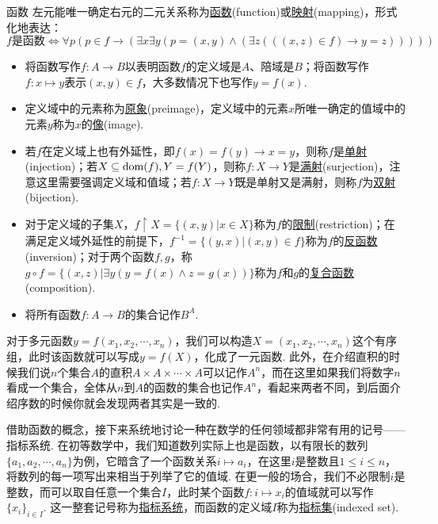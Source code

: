 \begin{definition}{函数}
    左元能唯一确定右元的二元关系称为\underline{函数}(function)或\underline{映射}(mapping)，形式化地表达：
    \[f \mbox{是函数} \Longleftrightarrow \forall p (p \in f \rightarrow (\exists x \exists y(p = (x,y) \wedge (\exists z(((x,z ) \in f) \rightarrow y=z)))))\]
    \begin{itemize}
        \item  将函数写作\(f:A \to B\)以表明函数\(f\)的定义域是\(A\)、陪域是\(B\)；将函数写作\(f:x \mapsto y\)表示\((x,y) \in f\)，大多数情况下也写作\(y=f(x)\).
        \item  定义域中的元素称为\underline{原象}(preimage)，定义域中的元素\(x\)所唯一确定的值域中的元素\(y\)称为\(x\)的\underline{像}(image).
        \item  若\(f\)在定义域上也有外延性，即\(f(x)=f(y) \rightarrow x=y\)，则称\(f\)是\underline{单射}(injection)；若\(X\subseteq{\rm dom}(f), Y=f(Y)\)，则称\(f:X\to Y\)是\underline{满射}(surjection)，注意这里需要强调定义域和值域；若\(f:X \to Y\)既是单射又是满射，则称\(f\)为\underline{双射}(bijection).
        \item  对于定义域的子集\(X\)，\(f\upharpoonright X=\{(x,y)|x \in X\}\)称为\(f\)的\underline{限制}(restriction)；在满足定义域外延性的前提下，\(f^{-1}=\{(y,x)|(x,y) \in f\}\)称为\(f\)的\underline{反函数}(inversion)；对于两个函数\(f,g\)，称\(g \circ f = \{(x,z)| \exists y(y=f(x) \wedge z=g(x))\}\)称为\(f\)和\(g\)的\underline{复合函数}(composition).
        \item  将所有函数\(f:A \to B\)的集合记作\(B^A\).
    \end{itemize}
\end{definition}

对于多元函数\(y = f(x_1,x_2,\cdots,x_n)\)，我们可以构造\(X = (x_1,x_2,\cdots,x_n)\)这个有序组，此时该函数就可以写成\(y = f(X)\)，化成了一元函数. 此外，在介绍直积的时候我们说\(n\)个集合\(A\)的直积\(A \times A \times \cdots \times A\)可以记作\(A^n\)，而在这里如果我们将数字\(n\)看成一个集合，全体从\(n\)到\(A\)的函数的集合也记作\(A^n\)，看起来两者不同，到后面介绍序数的时候你就会发现两者其实是一致的.

借助函数的概念，接下来系统地讨论一种在数学的任何领域都非常有用的记号——指标系统. 在初等数学中，我们知道数列实际上也是函数，以有限长的数列\(\{a_1,a_2,\cdots,a_n\}\)为例，它暗含了一个函数关系\(i \mapsto a_i\)，在这里\(i\)是整数且\(1 \leq i \leq n\)，将数列的每一项写出来相当于列举了它的值域. 在更一般的场合，我们不必限制\(i\)是整数，而可以取自任意一个集合\(I\)，此时某个函数\(f: i \mapsto x_i\)的值域就可以写作\(\{x_i\}_{i \in I}\). 这一整套记号称为\underline{指标系统}，而函数的定义域\(I\)称为\underline{指标集}(indexed set).

